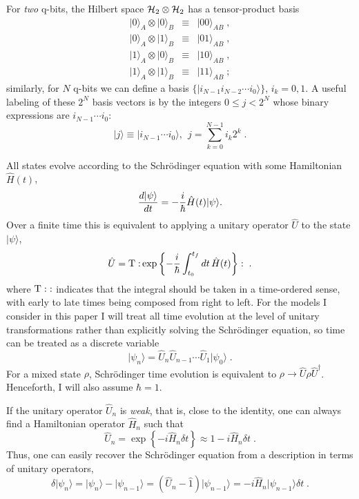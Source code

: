 \documentclass[12pt]{article}
\def\ket#1{{| #1 \rangle}}
\def\id{{\hat 1}}
\def\H{{\hat H}}
\def\U{{\hat U}}
\def\Udag{{\hat U^\dagger}}
\begin{document}
For {\it two} q-bits, the Hilbert space ${\cal H}_2\otimes{\cal H}_2$
has a tensor-product basis
\begin{eqnarray}
\ket{0}_A\otimes\ket{0}_B &\equiv& \ket{00}_{AB} \;, \nonumber\\
\ket{0}_A\otimes\ket{1}_B &\equiv& \ket{01}_{AB} \;, \nonumber\\
\ket{1}_A\otimes\ket{0}_B &\equiv& \ket{10}_{AB} \;, \nonumber\\
\ket{1}_A\otimes\ket{1}_B &\equiv& \ket{11}_{AB} \;;
\end{eqnarray}
similarly, for $N$ q-bits we can define a basis
$\{ \ket{i_{N-1}i_{N-2}\cdots i_0} \}$, $i_k=0,1$.  A useful labeling of
these $2^N$ basis vectors is by the integers $0\le j < 2^N$ whose
binary expressions are $i_{N-1}\cdots i_0$:
\begin{equation}
\ket{j} \equiv \ket{i_{N-1}\cdots i_0},\ \ 
  j = \sum_{k=0}^{N-1} i_k 2^k \;.
\end{equation}

All states evolve according to the Schr\"odinger equation with some
Hamiltonian $\H(t)$,
\begin{equation}
{d\ket\psi\over dt} = - {i\over\hbar} \H(t) \ket\psi.
\label{schrodinger}
\end{equation}
Over a finite time this is equivalent to applying a unitary operator
$\U$ to the state $\ket\psi$,
\begin{equation}
\U = {\rm T:} \exp \left\{ -{i\over\hbar} \int_{t_0}^{t_f} dt\, \H(t)
  \right\} : \;.
\end{equation}
where ${\rm T:}:$ indicates that the integral should be taken in a
time-ordered sense, with early to late times being composed from right
to left.  For the models I consider in this paper I will treat all time
evolution at the level of unitary transformations rather than explicitly
solving the Schr\"odinger equation, so time can be treated as a discrete
variable
\begin{equation}
\ket{\psi_n} = \U_n \U_{n-1} \cdots \U_1 \ket{\psi_0} \;.
\end{equation}
For a mixed state $\rho$, Schr\"odinger time evolution is
equivalent to $\rho \rightarrow \U \rho \Udag$.  Henceforth, I will
also assume $\hbar=1$.

If the unitary operator $\U_n$ is {\it weak}, that is, close to the
identity, one can always find a Hamiltonian operator $\H_n$ such that
\begin{equation}
\U_n = \exp\left\{ -i \H_n \delta t \right\} \approx 1 - i \H_n \delta t \;.
\end{equation}
Thus, one can easily recover the Schr\"odinger equation from a description
in terms of unitary operators,
\begin{equation}
\delta\ket{\psi_n} = \ket{\psi_n} - \ket{\psi_{n-1}}
  = (\U_n - \id)\ket{\psi_{n-1}} = - i\H_n\ket{\psi_{n-1}} \delta t \;.
\end{equation}
\end{document}
